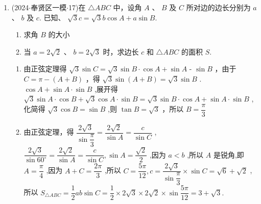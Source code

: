 \begin{enumerate}
    \item (2024$\cdot$奉贤区一模$\cdot$17)在 $\bigtriangleup  {ABC}$ 中，设角 $A$ 、 $B$ 及 $C$ 所对边的边长分别为 $a$ 、 $b$ 及 $c$. 已知、 $\sqrt{3}c =  \sqrt{3}b\cos A + a\sin B$.
    \begin{enumerate}
        \item 求角 $B$ 的大小
        \item 当 $a = 2\sqrt{2}$ 、 $b = 2\sqrt{3}$ 时，求边长 $c$ 和 $\bigtriangleup {ABC}$ 的面积 $S$.
    \end{enumerate}
    \begin{jieda}
        \begin{enumerate}
            \item 由正弦定理得 $\sqrt{3}\sin C = \sqrt{3}\sin B \cdot  \cos A + \sin A$ - $\sin B$ ，由于 $C = \pi  - \left( {A + B}\right)$ ，得 $\sqrt{3}\sin \left( {A + B}\right)  = \sqrt{3}\sin B$ . $\cos A + \sin A \cdot  \sin B$ ,展开得 $\sqrt{3}\sin A \cdot  \cos B + \sqrt{3}\cos A \cdot  \sin B =  \sqrt{3}\sin B \cdot  \cos A + \sin A \cdot  \sin B$ ,化简得 $\sqrt{3}\cos B = \sin B$ ,则 $\tan B = \sqrt{3}$ ，所以 $B = \dfrac{\pi }{3}$ 
            
            \item 由正弦定理，得 $\dfrac{2\sqrt{3}}{\sin \dfrac{\pi }{3}} = \dfrac{2\sqrt{2}}{\sin A} = \dfrac{c}{\sin C}$ , $\dfrac{2\sqrt{3}}{\sin {60}^{ \circ  }} = \dfrac{2\sqrt{2}}{\sin A} =  \dfrac{c}{\sin C},\sin A = \dfrac{\sqrt{2}}{2}$ ,因为 $a < b$ ,所以 $A$ 是锐角,即 $A = \dfrac{\pi }{4}$ ,因为 $A + C = \dfrac{2\pi }{3}$ ,所以 $C = \dfrac{5\pi }{12},c = \dfrac{2\sqrt{3}}{\sin \dfrac{\pi }{3}} \times  \sin C = \sqrt{6} + \sqrt{2}$ ,所以 ${S}_{\bigtriangleup {ABC}} = \dfrac{1}{2}{ab}\sin C = \dfrac{1}{2} \times  2\sqrt{3} \times  2\sqrt{2} \times  \sin \dfrac{5\pi }{12} = 3 + \sqrt{3}.$
        \end{enumerate}
    \end{jieda}


\end{enumerate}
